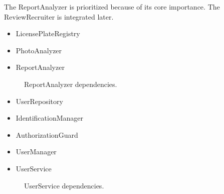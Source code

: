 The ReportAnalyzer is prioritized because of its core importance. The ReviewRecruiter is integrated later.
\begin{itemize}
    \item 
    LicensePlateRegistry
    \item 
    PhotoAnalyzer
    \item 
    ReportAnalyzer
\end{itemize}

\begin{figure}[H]
    \centering
    \caption{\label{fig:ReportAnalyzer-dependencies}ReportAnalyzer dependencies.}
\end{figure}

\begin{itemize}
    \item 
    UserRepository
    \item 
    IdentificationManager
    \item 
    AuthorizationGuard
    \item 
    UserManager
    \item 
    UserService
\end{itemize}

\begin{figure}[H]
    \centering
    \caption{\label{fig:UserService-dependencies}UserService dependencies.}
\end{figure}

